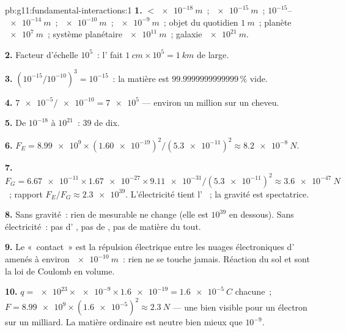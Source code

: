 \begin{solution}{pb:g11:fundamental-interactions:1}
\textbf{1.}  $< \qty{e-18}{m}$~;
 $\qty{e-15}{m}$~;
 $10^{-15}$--$\qty{e-14}{m}$~;
 $\qty{e-10}{m}$~;
 $\qty{e-9}{m}$~; objet du
quotidien $\qty{1}{m}$~; planète $\qty{e7}{m}$~; système planétaire
$\qty{e11}{m}$~; galaxie $\qty{e21}{m}$.

\textbf{2.} Facteur d'échelle $10^{5}$~: l'
 fait
$\qty{1}{cm} \times 10^{5} = \qty{1}{km}$ de large.

\textbf{3.} $(10^{-15}/10^{-10})^3 = 10^{-15}$~: la matière est
$\num{99.9999999999999}\,\%$ vide.

\textbf{4.} $\num{7e-5}/\num{e-10} = \num{7e5}$
 --- environ un million sur un
cheveu.

\textbf{5.} De $10^{-18}$ à $10^{21}$~: $39$
 de dix.

\textbf{6.} $F_E = \num{8.99e9} \times (\num{1.60e-19})^2 /
(\num{5.3e-11})^2 \approx \qty{8.2e-8}{N}$.

\textbf{7.} $F_G = \num{6.67e-11} \times \num{1.67e-27} \times
\num{9.11e-31}/(\num{5.3e-11})^2 \approx \qty{3.6e-47}{N}$~; rapport
$F_E/F_G \approx \num{2.3e39}$. L'électricité tient l'
~; la gravité est spectatrice.

\textbf{8.} Sans gravité~: rien de mesurable ne change (elle est
$10^{39}$ en dessous). Sans électricité~: pas d'
, pas de
, pas de matière du tout.

\textbf{9.} Le «~contact~» est la répulsion électrique entre les nuages
électroniques d' amenés à environ
$\qty{e-10}{m}$~: rien ne se touche jamais. Réaction du sol et
 sont la loi de Coulomb en
volume.

\textbf{10.} $q = \num{e23} \times \num{e-9} \times \num{1.6e-19} =
\qty{1.6e-5}{C}$ chacune~;
$F = \num{8.99e9} \times (\num{1.6e-5})^2 \approx \qty{2.3}{N}$ --- une
 bien visible pour un électron sur un
milliard. La matière ordinaire est neutre bien mieux que $10^{-9}$.


\end{solution}
